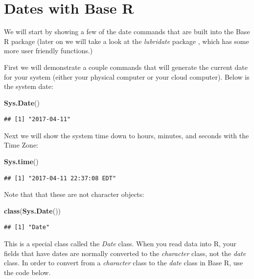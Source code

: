 \documentclass[]{book}
\newenvironment{Shaded}{\begin{snugshade}}{\end{snugshade}}
\newcommand{\KeywordTok}[1]{\textcolor[rgb]{0.13,0.29,0.53}{\textbf{{#1}}}}
\newcommand{\NormalTok}[1]{{#1}}
\begin{document}
\section{Dates with Base R}\label{dates-with-base-r}

We will start by showing a few of the date commands that are built into
the Base R package (later on we will take a look at the \emph{lubridate}
package \citep{R-lubridate}, which has some more user friendly
functions.)

First we will demonstrate a couple commands that will generate the
current date for your system (either your physical computer or your
cloud computer). Below is the system date:

\begin{Shaded}
\begin{Highlighting}[]
\KeywordTok{Sys.Date}\NormalTok{()}
\end{Highlighting}
\end{Shaded}

\begin{verbatim}
## [1] "2017-04-11"
\end{verbatim}

Next we will show the system time down to hours, minutes, and seconds
with the Time Zone:

\begin{Shaded}
\begin{Highlighting}[]
\KeywordTok{Sys.time}\NormalTok{()}
\end{Highlighting}
\end{Shaded}

\begin{verbatim}
## [1] "2017-04-11 22:37:08 EDT"
\end{verbatim}

Note that that these are not character objects:

\begin{Shaded}
\begin{Highlighting}[]
\KeywordTok{class}\NormalTok{(}\KeywordTok{Sys.Date}\NormalTok{())}
\end{Highlighting}
\end{Shaded}

\begin{verbatim}
## [1] "Date"
\end{verbatim}

This is a special class called the \emph{Date} class. When you read data
into R, your fields that have dates are normally converted to the
\emph{character} class, not the \emph{date} class. In order to convert
from a \emph{character} class to the \emph{date} class in Base R, use
the code below.
\end{document}
